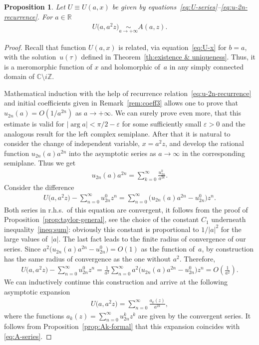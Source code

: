 \documentclass[pdftex]{sigma}
\numberwithin{equation}{section}
\newtheorem{Proposition}[Theorem]{Proposition}
 { \theoremstyle{definition}
\newtheorem{Remark}[Theorem]{Remark} }
\begin{document}
\begin{Proposition}\label{prop:U-A} Let $U\equiv U(a,x)$ be given by equations~\eqref{eq:U-series}--\eqref{eq:u-2n-recurrence}. For $a\in\mathbb{R}$
\begin{gather*}%
U\big(a,a^2z\big)\underset{a\to+\infty}\sim A(a,z).
\end{gather*}
\end{Proposition}
\begin{proof}Recall that function $U(a,x)$ is related, via equation~\eqref{eq:U-x} for $b=a$, with the solu\-tion~$u(\tau)$
defined in Theorem~\ref{th:existence & uniqueness}. Thus, it is a meromorphic function of $x$ and holomorphic of~$a$ in any simply connected domain of $\mathbb{C}{\setminus} i\mathbb{Z}$.

Mathematical induction with the help of recurrence relation~\eqref{eq:u-2n-recurrence} and initial coefficients
given in Remark~\ref{rem:coeff3} allows one to prove that $u_{2n}(a)=O\left(1/a^{2n}\right)$ as $a\to+\infty$.
We can surely prove even more, that this estimate is valid for $|\arg a|<\pi/2-\varepsilon$ for some
sufficiently small $\varepsilon>0$ and the analogous result for the left complex semiplane. After that it is
natural to consider the change of independent variable, $x=a^2z$, and develop the rational function
$u_{2n}(a)a^{2n}$ into the asymptotic series as $a\to\infty$ in the corresponding semiplane. Thus we get
\begin{gather*}
u_{2n}(a)a^{2n}=\sum\limits^\infty_{k=0}\frac{u^k_{2n}}{a^{2k}}.
\end{gather*}
Consider the difference
\begin{gather*}
U\big(a,a^2z\big)-\sum\limits^\infty_{n=0}u^0_{2n}z^n=\sum\limits^\infty_{n=0}\big(u_{2n}(a)a^{2n}-u^0_{2n}\big)z^n.
\end{gather*}
Both series in r.h.s.\ of this equation are convergent, it follows from the proof of
Proposition~\ref{prop:taylor-general}, see the choice of the constant $C_1$ underneath inequality~\eqref{ineq:sum}:
obviously this constant is proportional to $1/|a|^2$ for the large values of~$|a|$. The last fact leads to the
finite radius of convergence of our series. Since $a^2\big(u_{2n}(a)a^{2n}-u^0_{2n}\big)=O(1)$ as the function of~$a$,
by construction has the same radius of convergence as the one without $a^2$. Therefore,
\begin{gather*}
U\big(a,a^2z\big)-\sum\limits^\infty_{n=0}u^0_{2n}z^n
=\frac1{a^2}\sum\limits^\infty_{n=0}a^2\big(u_{2n}(a)a^{2n}-u^0_{2n}\big)z^n=O\left(\frac1{a^2}\right).
\end{gather*}
We can inductively continue this construction and arrive at the following asymptotic expansion
\begin{gather*}
U\big(a,a^2z\big)=\sum\limits^\infty_{n=0}\frac{a_k(z)}{a^{2k}},
\end{gather*}
where the functions $a_k(z)=\sum\limits^\infty_{n=0}u^k_{2n}z^k$ are given by the convergent series.
It follows from Proposition~\ref{prop:Ak-formal} that this expansion coincides with \eqref{eq:A-series}.
\end{proof}
\end{document}
